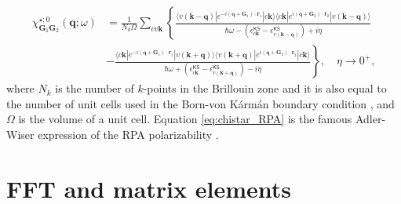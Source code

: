 \documentclass[11pt, oneside]{article}          %
\begin{document}
\begin{equation}
  \label{eq:chistar_RPA}
  \begin{aligned}
    \chi^{\star;0}_{{\bm G}_1 {\bm G}_2} ({\bm q}; \omega) & = \frac{1}{N_k \Omega} \sum_{c v {\bm k}} \left \{ \frac{\langle v ({\bm k} - {\bm q}) | e^{-i ({\bm q} + {\bm G}_1) \cdot {\bm r}_1} | c {\bm k} \rangle \langle c {\bm k} | e^{i ({\bm q} + {\bm G}_2) \cdot {\bm r}_2} | v ({\bm k} - {\bm q}) \rangle}{\hbar \omega - (\epsilon^{\mathsf{KS}}_{c {\bm k}} - \epsilon^{\mathsf{KS}}_{v ({\bm k} - {\bm q})}) + i \eta} \right . \\
    & \left . - \frac{\langle c {\bm k} | e^{-i ({\bm q} + {\bm G}_1)\cdot {\bm r}_1} | v ({\bm k} + {\bm q}) \rangle \langle v ({\bm k} + {\bm q}) | e^{i({\bm q} + {\bm G}_2) \cdot {\bm r}_2} | c {\bm k} \rangle}{\hbar \omega + (\epsilon^{\mathsf{KS}}_{c {\bm k}} - \epsilon^{\mathsf{KS}}_{v ({\bm k} + {\bm q})}) - i \eta} \right \}, \quad \eta \rightarrow 0^{+},
  \end{aligned}
\end{equation}
where $N_k$ is the number of $k$-points in the Brillouin zone and it is also equal to the number of unit cells used in the Born-von K\'{a}rm\'{a}n boundary condition \cite{cohen2016fundamentals}, and $\Omega$ is the volume of a unit cell. Equation \eqref{eq:chistar_RPA} is the famous Adler-Wiser expression of the RPA polarizability \cite{adler1962quantum, wiser1963dielectric}.

\section{FFT and matrix elements}
\label{sec:fft-matrix-elements}
\end{document}
